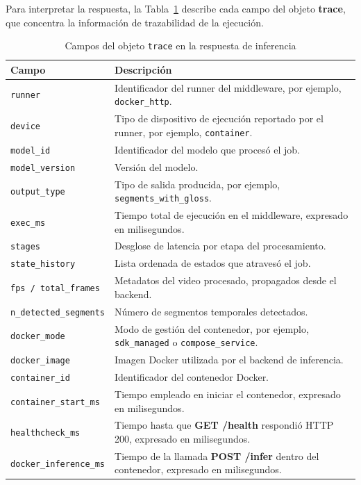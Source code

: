 Para interpretar la respuesta, la Tabla~\ref{tab:trace_campos} describe cada campo del objeto \textbf{trace}, que concentra la información de trazabilidad de la ejecución.

\begin{table}[H]
\centering
\caption{Campos del objeto \texttt{trace} en la respuesta de inferencia}
\label{tab:trace_campos}
\scriptsize
\renewcommand{\arraystretch}{1.08}
\setlength{\tabcolsep}{4pt}

\begin{tabular}{
    >{\raggedright\arraybackslash}p{4.2cm}
    >{\raggedright\arraybackslash}p{8.8cm}
}
\toprule
\textbf{Campo} & \textbf{Descripción} \\
\midrule
\texttt{runner} & Identificador del runner del middleware, por ejemplo, \texttt{docker\_http}. \\
\texttt{device} & Tipo de dispositivo de ejecución reportado por el runner, por ejemplo, \texttt{container}. \\
\texttt{model\_id} & Identificador del modelo que procesó el job. \\
\texttt{model\_version} & Versión del modelo. \\
\texttt{output\_type} & Tipo de salida producida, por ejemplo, \texttt{segments\_with\_gloss}. \\
\texttt{exec\_ms} & Tiempo total de ejecución en el middleware, expresado en milisegundos. \\
\texttt{stages} & Desglose de latencia por etapa del procesamiento. \\
\texttt{state\_history} & Lista ordenada de estados que atravesó el job. \\
\texttt{fps / total\_frames} & Metadatos del video procesado, propagados desde el backend. \\
\texttt{n\_detected\_segments} & Número de segmentos temporales detectados. \\
\texttt{docker\_mode} & Modo de gestión del contenedor, por ejemplo, \texttt{sdk\_managed} o \texttt{compose\_service}. \\
\texttt{docker\_image} & Imagen Docker utilizada por el backend de inferencia. \\
\texttt{container\_id} & Identificador del contenedor Docker. \\
\texttt{container\_start\_ms} & Tiempo empleado en iniciar el contenedor, expresado en milisegundos. \\
\texttt{healthcheck\_ms} & Tiempo hasta que \textbf{GET /health} respondió HTTP 200, expresado en milisegundos. \\
\texttt{docker\_inference\_ms} & Tiempo de la llamada \textbf{POST /infer} dentro del contenedor, expresado en milisegundos. \\
\bottomrule
\end{tabular}
\end{table}

